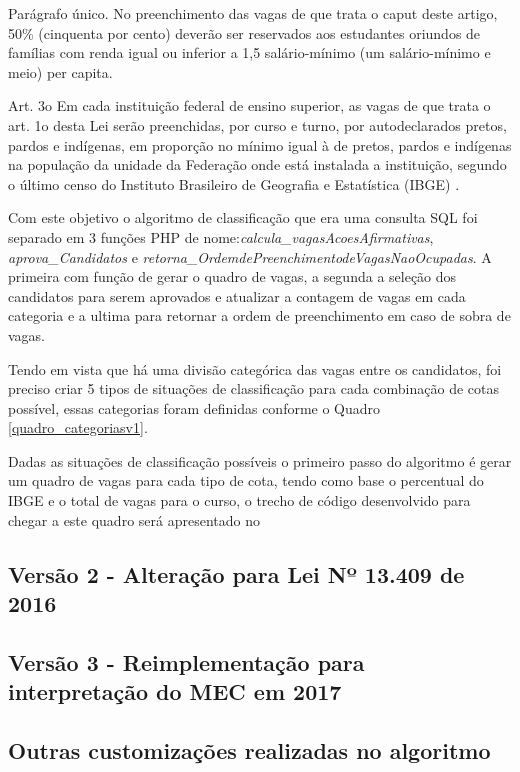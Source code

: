\begin{citacao}
Parágrafo único.  No preenchimento das vagas de que trata o caput deste artigo, 50\% (cinquenta por cento) deverão ser reservados aos estudantes oriundos de famílias com renda igual ou inferior a 1,5 salário-mínimo (um salário-mínimo e meio) per capita.

Art. 3o  Em cada instituição federal de ensino superior, as vagas de que trata o art. 1o desta Lei serão preenchidas, por curso e turno, por autodeclarados pretos, pardos e indígenas, em proporção no mínimo igual à de pretos, pardos e indígenas na população da unidade da Federação onde está instalada a instituição, segundo o último censo do Instituto Brasileiro de Geografia e Estatística (IBGE) \cite{leicotas}.
\end{citacao}

Com este objetivo o algoritmo de classificação que era uma consulta SQL foi separado em 3 funções PHP de nome:\textit{calcula\_vagasAcoesAfirmativas}, \textit{aprova\_Candidatos} e \textit{retorna\_OrdemdePreenchimentodeVagasNaoOcupadas}.  A primeira com função de gerar o quadro de vagas, a segunda a seleção dos candidatos para serem aprovados e atualizar a contagem de vagas em cada categoria e a ultima para retornar a ordem de preenchimento em caso de sobra de vagas.

Tendo em vista que há uma divisão categórica das vagas entre os candidatos, foi preciso criar 5 tipos de situações de classificação para cada combinação de cotas possível, essas categorias foram definidas conforme o Quadro \ref{quadro_categoriasv1}.



\newpage
Dadas as situações de classificação possíveis o primeiro passo do algoritmo é gerar um quadro de vagas para cada tipo de cota, tendo como base o percentual do \gls{IBGE} e o total de vagas para o curso, o trecho de código desenvolvido para chegar a este quadro será apresentado no



\subsection{Versão 2 - Alteração para Lei Nº 13.409 de 2016 }
\label{versao2}

\subsection{Versão 3 - Reimplementação para interpretação do MEC em 2017 }
\label{versao3}

\subsection{Outras customizações realizadas no algoritmo}
\label{outrasVersoes}